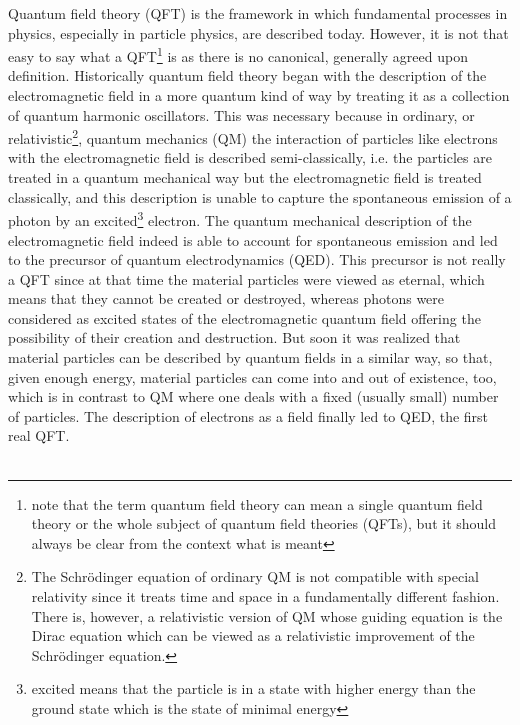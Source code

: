 Quantum field theory (QFT) is the framework in which fundamental processes in physics, especially in particle physics, are described today. However, it is not that easy to say what a QFT\footnote{note that the term quantum field theory can mean a single quantum field theory or the whole subject of quantum field theories (QFTs), but it should always be clear from the context what is meant} is as there is no canonical, generally agreed upon definition. Historically quantum field theory began with the description of the electromagnetic field in a more quantum kind of way by treating it as a collection of quantum harmonic oscillators. This was necessary because in ordinary, or relativistic\footnote{The Schr{\"o}dinger equation of ordinary QM is not compatible with special relativity since it treats time and space in a fundamentally different fashion. There is, however, a relativistic version of QM whose guiding equation is the Dirac equation which can be viewed as a relativistic improvement of the Schr{\"o}dinger equation.}, quantum mechanics (QM) the interaction of particles like electrons with the electromagnetic field is described semi-classically, i.e. the particles are treated in a quantum mechanical way but the electromagnetic field is treated classically, and this description is unable to capture the spontaneous emission of a photon by an excited\footnote{excited means that the particle is in a state with higher energy than the ground state which is the state of minimal energy} electron. The quantum mechanical description of the electromagnetic field indeed is able to account for spontaneous emission and led to the precursor of quantum electrodynamics (QED). This precursor is not really a QFT since at that time the material particles were viewed as eternal, which means that they cannot be created or destroyed, whereas photons were considered as excited states of the electromagnetic quantum field offering the possibility of their creation and destruction. But soon it was realized that material particles can be described by quantum fields in a similar way, so that, given enough energy, material particles can come into and out of existence, too, which is in contrast to QM where one deals with a fixed (usually small) number of particles. The description of electrons as a field finally led to QED, the first real QFT.
\\\\
